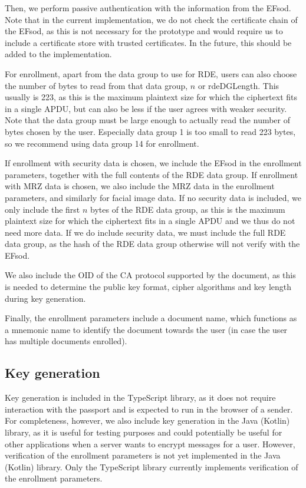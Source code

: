 Then, we perform passive authentication with the information from the EFsod.
Note that in the current implementation, we do not check the certificate chain of the EFsod, as this is not necessary for the prototype and would require us to include a certificate store with trusted certificates.
In the future, this should be added to the implementation.

For enrollment, apart from the data group to use for RDE, users can also choose the number of bytes to read from that data group, $n$ or \textsf{rdeDGLength}.
This usually is 223, as this is the maximum plaintext size for which the ciphertext fits in a single APDU, but can also be less if the user agrees with weaker security.
Note that the data group must be large enough to actually read the number of bytes chosen by the user.
Especially data group 1 is too small to read 223 bytes, so we recommend using data group 14 for enrollment.

If enrollment with security data is chosen, we include the EFsod in the enrollment parameters, together with the full contents of the RDE data group.
If enrollment with MRZ data is chosen, we also include the MRZ data in the enrollment parameters, and similarly for facial image data.
If no security data is included, we only include the first $n$ bytes of the RDE data group, as this is the maximum plaintext size for which the ciphertext fits in a single APDU and we thus do not need more data.
If we do include security data, we must include the full RDE data group, as the hash of the RDE data group otherwise will not verify with the EFsod.

We also include the OID of the CA protocol supported by the document, as this is needed to determine the public key format, cipher algorithms and key length during key generation.

Finally, the enrollment parameters include a document name, which functions as a mnemonic name to identify the document towards the user (in case the user has multiple documents enrolled).

\subsection{Key generation}\label{subsec:key-generation}
Key generation is included in the TypeScript library, as it does not require interaction with the passport and is expected to run in the browser of a sender.
For completeness, however, we also include key generation in the Java (Kotlin) library, as it is useful for testing purposes and could potentially be useful for other applications when a server wants to encrypt messages for a user.
However, verification of the enrollment parameters is not yet implemented in the Java (Kotlin) library.
Only the TypeScript library currently implements verification of the enrollment parameters.

